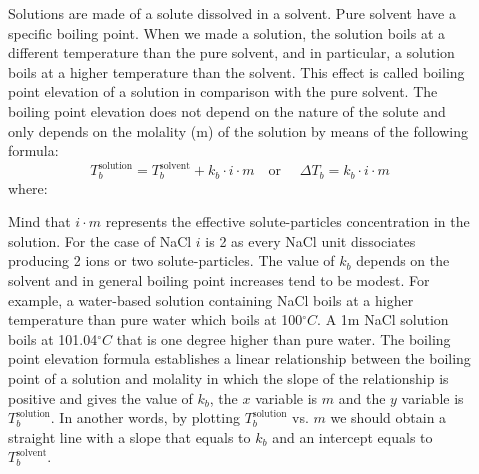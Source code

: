 \documentclass[main.tex]{subfiles}
\newcommand\chapterlabel{Ch-solutions}\setcounter{figurenewcounter}{0}\setcounter{tablenewcounter}{0}\setcounter{formulanewcounter}{0}
\begin{document}
\sloppy 
\begin{description}
\item[] 
Solutions are made of a solute dissolved in a solvent. Pure solvent have a specific boiling point. When we made a solution, the solution boils at a different temperature than the pure solvent, and in particular, a solution boils at a higher temperature than the solvent. This effect is called boiling point elevation of a solution in comparison with the pure solvent. The boiling point elevation does not depend on the nature of the solute and only depends on the molality (m) of the solution by means of the following formula:
\begin{equation}
\boxed{ T_b^{\text{solution}}=T_b^{\text{solvent}}+k_b\cdot i\cdot m 	}
\quad  \text{or }\quad 
\boxed{\Delta T_b =k_b\cdot i\cdot m}
\label{\chapterlabel:equation10}
\end{equation}
where:
Mind that $i\cdot m$ represents the effective solute-particles concentration in the solution. For the case of NaCl $i$ is 2 as every NaCl unit dissociates producing 2 ions or two solute-particles. The value of $k_b$ depends on the solvent and in general boiling point increases tend to be modest. For example, a water-based solution containing NaCl boils at a higher temperature than pure water which boils at 100$^{\circ}C$. A 1m NaCl solution boils at 101.04$^{\circ}C$ that is one degree higher than pure water.
The boiling point elevation formula establishes a linear relationship between the boiling point of a solution and molality in which the slope of the relationship is positive and gives the value of $k_b$, the $x$ variable is $m$ and the $y$ variable is $T_b^{\text{solution}}$. In another words, by plotting $T_b^{\text{solution}}$ vs. $m$ we should obtain a straight line with a slope that equals to $k_b$ and an intercept equals to $T_b^{\text{solvent}}$.



\end{description}
\end{document}
